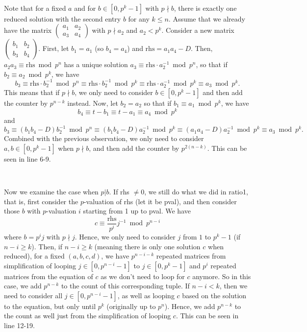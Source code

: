 \documentclass[letterpaper,12pt]{article}
\begin{document}
\

Note that for a fixed $a$ and for $b \in [0, p^k-1]$ with $p \nmid b$,  
there is exactly one reduced solution with the second entry $b$ for any $k \leq n$. 
Assume that we already have the matrix $\begin{pmatrix}
a_1 & a_2 \\ a_3 & a_4
\end{pmatrix}$ with $p \nmid a_2$ and $a_2 < p^k$. Consider a new matrix 
$\begin{pmatrix}
b_1 & b_2 \\ b_3 & b_4
\end{pmatrix}$.
First, let $b_1 = a_1$ (so $b_4 = a_4$) and 
$\text{rhs} = a_1a_4-D$.
Then, $a_2a_3 \equiv \text{rhs} \bmod p^{n}$ has a unique solution 
$a_3 \equiv \text{rhs} \cdot a_2^{-1} \bmod p^{n}$,
so that if $b_2 \equiv a_2 \bmod p^k$, we have 
\vspace{0.1in}
\[
b_3 \equiv \text{rhs} \cdot b_2^{-1} \bmod p^{n}
\equiv \text{rhs} \cdot b_2^{-1} \bmod p^{k}
\equiv \text{rhs} \cdot a_2^{-1} \bmod p^k
\equiv a_3  \bmod p^k.
\]
\vspace{0.1in}
This means that if $p \nmid b$, we only need to consider $b \in [0, p^{k}-1]$
and then add the counter by $p^{n-k}$ instead.
Now, let $b_2 = a_2$ so that if $b_1 \equiv a_1 \bmod p^k$, we have
\[
b_4 \equiv t-b_1 \equiv t-a_1 \equiv a_4 \bmod p^k
\] 
and 
\[
b_3 \equiv (b_1b_4 - D)b_2^{-1} \bmod p^{n}
\equiv (b_1b_4 - D)a_2^{-1} \bmod p^k 
\equiv (a_1a_4 - D)a_2^{-1} \bmod p^k 
\equiv a_3 \bmod p^k.
\]
Combined with the previous observation, 
we only need to consider $a,b \in [0, p^{k}-1]$
when $p \nmid b$,
and then add the counter by $p^{2(n-k)}$. 
This can be seen in line 6-9.

\

Now we examine the case when $p | b$.
If rhs $\neq 0$, we still do what we did in ratio1, that is,
first consider the $p$-valuation of rhs (let it be pval), 
and then consider those $b$ with $p$-valuation $i$ starting from 1 up to pval.
We have 
\[
c \equiv \frac{\text{rhs}}{p^i} j^{-1} \bmod p^{n - i}
\]
where $b = p^i j$ with $p \nmid j$.
Hence, we only need to consider $j$ from $1$ to $p^k-1$ (if $n-i \geq k$).
Then, if $n-i \geq k$ (meaning there is only one solution $c$ when reduced), for a fixed $(a, b, c, d)$, 
we have $p^{n-i-k}$ repeated matrices from simplification of 
looping $j \in [0, p^{n-i}-1]$ to $j \in [0, p^{k}-1]$
and $p^i$ repeated matrices from the equation of $c$ as we don't need to loop for $c$ anymore.
So in this case, we add $p^{n-k}$ to the count of this corresponding tuple.
If $n-i < k$, then we need to consider all $j \in [0, p^{n-i}-1]$,
as well as looping $c$ based on the solution to the equation, but only until $p^k$ (originally up to $p^n$).
Hence, we add $p^{n-k}$ to the count as well just from the simplification of looping $c$.
This can be seen in line 12-19.
\end{document}
